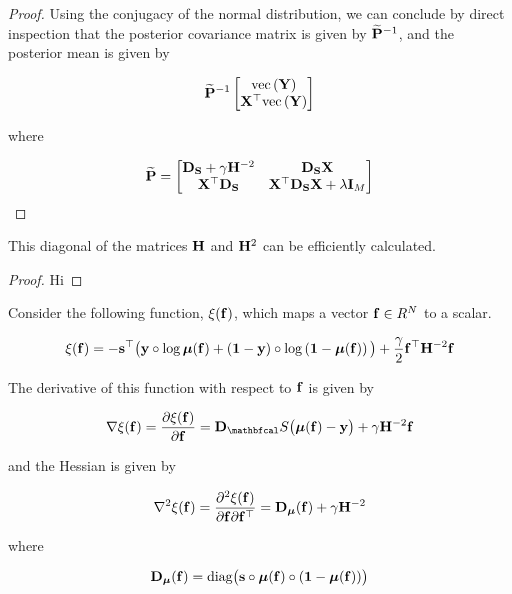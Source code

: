 \begin{proof}
    Using the conjugacy of the normal distribution, we can conclude by direct inspection that the posterior covariance matrix is given by $\widetilde{\mathbf{P}}^{-1}$, and the posterior mean is given by 

    $$
    \widetilde{\mathbf{P}}^{-1} \begin{bmatrix} \text{\textup{vec}}\left(\mathbf{Y}\right) \\ \mathbf{X}^\top \text{\textup{vec}}\left(\mathbf{Y}\right) \end{bmatrix}
    $$

    where 

    $$
    \widetilde{\mathbf{P}} = \begin{bmatrix}
        \mathbf{D}_{\mathbf{S}} + \gamma \mathbf{H}^{-2} & \mathbf{D}_{\mathbf{S}}  \mathbf{X} \\
        \mathbf{X}^\top \mathbf{D}_{\mathbf{S}} & \mathbf{X}^\top \mathbf{D}_{\mathbf{S}} \mathbf{X} + \lambda \mathbf{I}_M   
       \end{bmatrix}
    $$

\end{proof}


\begin{theorem}
    \label{the:efficient_H_diag}

    This diagonal of the matrices $\mathbf{H}$ and $\mathbf{H}^2$ can be efficiently calculated. 
\end{theorem}

\begin{proof}
    Hi 
\end{proof}


\begin{theorem}
    \label{the:gradient_and_hesian}

    Consider the following function, $\xi(\mathbf{f})$, which maps a vector $\mathbf{f} \in R^N$ to a scalar. 

    \begin{equation}
        \xi(\mathbf{f}) = -\mathbf{s}^\top \big(\mathbf{y} \circ \log \boldsymbol{\mu}(\mathbf{f}) + \left(\mathbf{1}  - \mathbf{y}\right) \circ \log \left(\mathbf{1} - \boldsymbol{\mu}(\mathbf{f}) \right)\big) + \frac{\gamma}{2} \mathbf{f}^\top \mathbf{H}^{-2} \mathbf{f}
    \end{equation}

    The derivative of this function with respect to $\mathbf{f}$ is given by 

    \begin{equation}
        \nabla \xi(\f) = \frac{\partial \xi(\f)}{\partial \f} = \D_\St \big(\muu(\f) - \y\big) + \gamma \HH^{-2} \f
    \end{equation}

    and the Hessian is given by 

    \begin{equation}
        \nabla^2 \xi(\mathbf{f}) = \frac{\partial^2\xi(\mathbf{f})}{\partial \mathbf{f} \partial \mathbf{f}^\top} =  \mathbf{D}_{\boldsymbol{\mu}}(\mathbf{f}) + \gamma \mathbf{H}^{-2}
    \end{equation}

    where 

    \begin{equation*}
        \mathbf{D}_{\boldsymbol{\mu}}(\mathbf{f}) = \textup{diag}\big(\mathbf{s} \circ \boldsymbol{\mu}(\mathbf{f}) \circ (\mathbf{1} - \boldsymbol{\mu}(\mathbf{f}))\big)
    \end{equation*}

\end{theorem}

